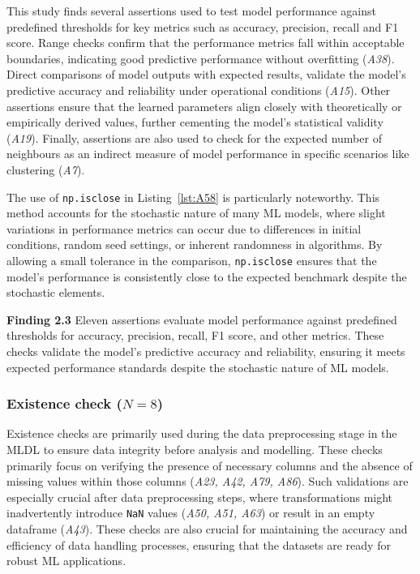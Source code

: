 \documentclass[smallextended]{svjour3}       %
\newcommand{\highlight}[1]{\begin{framed}%
  \noindent#1
\end{framed}}
\begin{document}
This study finds several assertions used to test model performance against predefined thresholds for key metrics such as accuracy, precision, recall and F1 score. Range checks confirm that the performance metrics fall within acceptable boundaries, indicating good predictive performance without overfitting (\emph{A38}). Direct comparisons of model outputs with expected results, validate the model's predictive accuracy and reliability under operational conditions (\emph{A15}). Other assertions ensure that the learned parameters align closely with theoretically or empirically derived values, further cementing the model’s statistical validity (\emph{A19}). Finally, assertions are also used to check for the expected number of neighbours as an indirect measure of model performance in specific scenarios like clustering (\emph{A7}).

The use of \lstinline{np.isclose} in Listing~\ref{lst:A58} is particularly noteworthy. This method accounts for the stochastic nature of many ML models, where slight variations in performance metrics can occur due to differences in initial conditions, random seed settings, or inherent randomness in algorithms. By allowing a small tolerance in the comparison, \lstinline{np.isclose} ensures that the model's performance is consistently close to the expected benchmark despite the stochastic elements.

\highlight{\textbf{Finding 2.3} Eleven assertions evaluate model performance against predefined thresholds for accuracy, precision, recall, F1 score, and other metrics. These checks validate the model's predictive accuracy and reliability, ensuring it meets expected performance standards despite the stochastic nature of ML models.}

\subsubsection{Existence check ($N = 8$)}

Existence checks are primarily used during the data preprocessing stage in the MLDL to ensure data integrity before analysis and modelling. These checks primarily focus on verifying the presence of necessary columns and the absence of missing values within those columns (\emph{A23, A42, A79, A86}). Such validations are especially crucial after data preprocessing steps, where transformations might inadvertently introduce \lstinline{NaN} values (\emph{A50, A51, A63}) or result in an empty dataframe (\emph{A43}). These checks are also crucial for maintaining the accuracy and efficiency of data handling processes, ensuring that the datasets are ready for robust ML applications.
\end{document}
